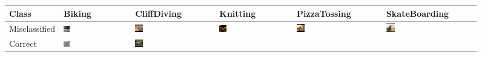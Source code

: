 \begin{figure}[t]
    \centering
        \begin{tabu} to \textwidth {|X[c,m]|X[c,m]X[c,m]X[c,m]X[c,m]X[c,m]|}
            \hline
            Class & Biking & CliffDiving & Knitting & PizzaTossing & SkateBoarding \\ \hline \hline
            Misclassified & 
            \includegraphics[width=0.1\textwidth]{images/rep/F_10.png}\vspace{2mm} & %
            \includegraphics[width=0.1\textwidth]{images/rep/F_21.png}\vspace{2mm} &
            \includegraphics[width=0.1\textwidth]{images/rep/F_49.png}\vspace{2mm} & 
            \includegraphics[width=0.1\textwidth]{images/rep/F_57.png}\vspace{2mm} &
            \includegraphics[width=0.1\textwidth]{images/rep/F_79.png}\vspace{2mm} \\
            Correct & 
            \includegraphics[width=0.1\textwidth]{images/rep/R_10.png} &
            \includegraphics[width=0.1\textwidth]{images/rep/R_21.png} &

\end{tabu}
\end{figure}

